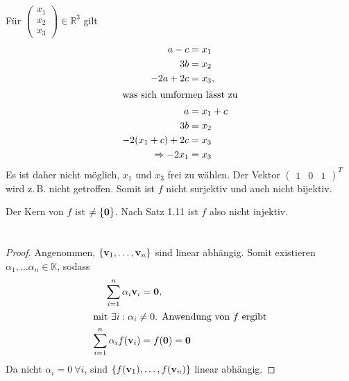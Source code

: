 \documentclass{../mfa}
\begin{document}
Für $\begin{pmatrix} x_1 \\ x_2 \\ x_3 \end{pmatrix}\in \mathbb{R}^3$ gilt 
\begin{align*}
   a - c                                  & = x_1 \\
   3b                                     & = x_2 \\
   -2a + 2c                               & = x_3, \\
   \intertext{was sich umformen lässt zu}
   a                                      & = x_1 + c \\
   3b                                     & = x_2 \\
   -2(x_1 + c) + 2c                       & = x_3 \\
   \Rightarrow -2x_1                      & = x_3
\end{align*}
Es ist daher nicht möglich, $x_1$ und $x_3$ frei zu wählen. Der Vektor
$\begin{pmatrix} 1 & 0 & 1 \end{pmatrix}^T$ wird z.\,B. nicht getroffen. Somit
ist $f$ nicht surjektiv und auch nicht bijektiv.

Der Kern von $f$ ist $\neq \{\mathbf{0}\}$. Nach Satz 1.11 ist $f$ also nicht injektiv.

\section{}
\subsection{}

\begin{proof}
   Angenommen, $\{\mathbf{v}_{1}, \ldots, \mathbf{v}_{n}\}$ sind linear abhängig. Somit existieren
   $\alpha_1, \ldots \alpha_n \in \mathbb{K}$, sodass
   \begin{align*}
      \sum_{i=1}^n \alpha_i \mathbf{v}_{i} &= \mathbf{0},\\
      \intertext{mit $\exists i : \alpha_i \neq 0$. Anwendung von $f$ ergibt}
      \sum_{i=1}^n \alpha_i f(\mathbf{v}_{i}) &= f(\mathbf{0}) = \mathbf{0}\\
   \end{align*}
   Da nicht $\alpha_i = 0 ~\forall i$, sind $\{f(\mathbf{v}_{1}), \ldots, f(\mathbf{v}_{n})\}$
   linear abhängig.
\end{proof}

\subsection{}
\end{document}
